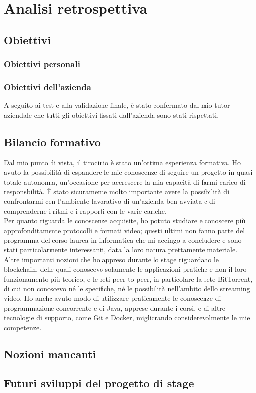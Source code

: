 \chapter{Analisi retrospettiva}
\section{Obiettivi}
\subsection{Obiettivi personali}
\subsection{Obiettivi dell'azienda}
A seguito ai test e alla validazione finale, è stato confermato dal mio tutor aziendale che tutti gli obiettivi fissati dall'azienda sono stati rispettati.

\section{Bilancio formativo}
Dal mio punto di vista, il tirocinio è stato un'ottima esperienza formativa. Ho avuto la possibilità di espandere le mie conoscenze di seguire un progetto in quasi totale autonomia, un'occasione per accrescere la mia capacità di farmi carico di responsbilità. È stato sicuramente molto importante avere la possibilità di confrontarmi con l'ambiente lavorativo di un'azienda ben avviata e di comprenderne i ritmi e i rapporti con le varie cariche.
\\
Per quanto riguarda le conoscenze acquisite, ho potuto studiare e conoscere più approfonditamente protocolli e formati video; questi ultimi non fanno parte del programma del corso laurea in informatica che mi accingo a concludere e sono stati particolarmente interessanti, data la loro natura prettamente materiale. Altre importanti nozioni che ho appreso durante lo stage riguardano le blockchain, delle quali conoscevo solamente le applicazioni pratiche e non il loro funzionamento più teorico, e le reti peer-to-peer, in particolare la rete BitTorrent, di cui non conoscevo né le specifiche, né le possibilità nell'ambito dello streaming video. Ho anche avuto modo di utilizzare praticamente le conoscenze di programmazione concorrente e di Java, apprese durante i corsi, e di altre tecnologie di supporto, come Git e Docker, migliorando considerevolmente le mie competenze.

\section{Nozioni mancanti}

\section{Futuri sviluppi del progetto di stage}

